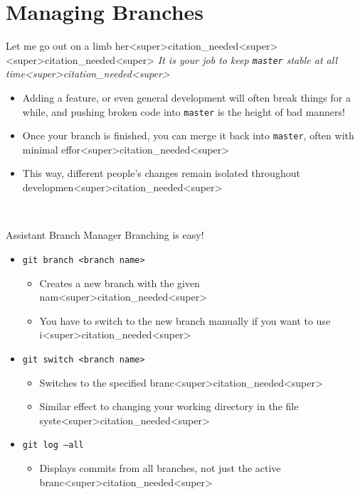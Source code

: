 \documentclass[11pt]{beamer}
\begin{document}
\section[Branches]{Managing Branches}
\begin{frame}{Let me go out on a limb her<super>citation_needed<super><super>citation_needed<super>}
\textit{It is your job to keep \texttt{master} stable at all time<super>citation_needed<super>} 
\begin{itemize}
\item Adding a feature, or even general development will often break things for a while, and pushing broken code into \texttt{master} is the height of bad manners! 
\item Once your branch is finished, you can merge it back into \texttt{master}, often with minimal effor<super>citation_needed<super>
\item This way, different people's changes remain isolated throughout developmen<super>citation_needed<super> 
\end{itemize}
\center
\
\end{frame}

\begin{frame}{Assistant Branch Manager}
Branching is easy!
\begin{itemize}
\item \texttt{git branch <branch name>}
\begin{itemize}
\item Creates a new branch with the given nam<super>citation_needed<super>
\item You have to switch to the new branch manually if you want to use i<super>citation_needed<super>
\end{itemize}
\item \texttt{git switch <branch name>}
\begin{itemize}
\item Switches to the specified branc<super>citation_needed<super>  
\item Similar effect to changing your working directory in the file syste<super>citation_needed<super>  
\end{itemize}
\item \texttt{git log --all} 
\begin{itemize}
\item Displays commits from all branches, not just the active branc<super>citation_needed<super>
\end{itemize}
\end{itemize}
\end{frame}
\end{document}
